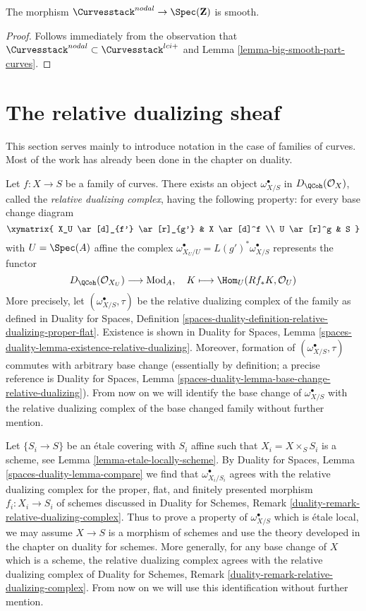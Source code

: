 \begin{lemma}
\label{lemma-nodal-curves-smooth}
The morphism $\Curvesstack^{nodal} \to \Spec(\mathbf{Z})$ is smooth.
\end{lemma}

\begin{proof}
Follows immediately from the observation that
$\Curvesstack^{nodal} \subset \Curvesstack^{lci+}$
and Lemma \ref{lemma-big-smooth-part-curves}.
\end{proof}




\section{The relative dualizing sheaf}
\label{section-relative-dualizing}

\noindent
This section serves mainly
to introduce notation in the case of families of curves.
Most of the work has already been done in the chapter on duality.

\medskip\noindent
Let $f : X \to S$ be a family of curves. There exists an object
$\omega_{X/S}^\bullet$ in $D_\QCoh(\mathcal{O}_X)$,
called the {\it relative dualizing complex}, having the following
property: for every base change diagram
$$
\xymatrix{
X_U \ar[d]_{f'} \ar[r]_{g'} & X \ar[d]^f \\
U \ar[r]^g & S
}
$$
with $U = \Spec(A)$ affine the complex
$\omega_{X_U/U}^\bullet = L(g')^*\omega_{X/S}^\bullet$
represents the functor
$$
D_\QCoh(\mathcal{O}_{X_U}) \longrightarrow \text{Mod}_A,\quad
K \longmapsto \Hom_U(Rf_*K, \mathcal{O}_U)
$$
More precisely, let $(\omega_{X/S}^\bullet, \tau)$
be the relative dualizing complex of the family as defined in
Duality for Spaces, Definition
\ref{spaces-duality-definition-relative-dualizing-proper-flat}.
Existence is shown in Duality for Spaces, Lemma
\ref{spaces-duality-lemma-existence-relative-dualizing}.
Moreover, formation of $(\omega_{X/S}^\bullet, \tau)$ commutes
with arbitrary base change (essentially by definition; a precise
reference is Duality for Spaces, Lemma
\ref{spaces-duality-lemma-base-change-relative-dualizing}).
From now on we will identify the base change of
$\omega_{X/S}^\bullet$ with the relative dualizing
complex of the base changed family without further mention.

\medskip\noindent
Let $\{S_i \to S\}$ be an \'etale covering with $S_i$ affine such that
$X_i = X \times_S S_i$ is a scheme, see Lemma \ref{lemma-etale-locally-scheme}.
By Duality for Spaces, Lemma \ref{spaces-duality-lemma-compare}
we find that $\omega_{X_i/S_i}^\bullet$ agrees with
the relative dualizing complex for the proper, flat, and
finitely presented morphism $f_i : X_i \to S_i$ of schemes
discussed in Duality for Schemes, Remark
\ref{duality-remark-relative-dualizing-complex}.
Thus to prove a property of $\omega_{X/S}^\bullet$
which is \'etale local, we may assume $X \to S$ is a morphism of schemes
and use the theory developed in the chapter on duality for schemes.
More generally, for any base change of $X$ which is a scheme,
the relative dualizing complex agrees with the
relative dualizing complex of Duality for Schemes, Remark
\ref{duality-remark-relative-dualizing-complex}.
From now on we will use this identification without further mention.

